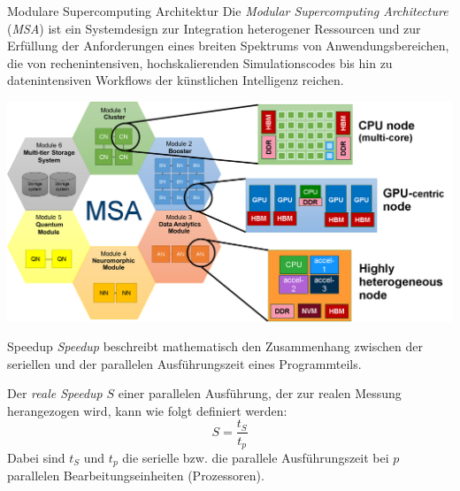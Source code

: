 \begin{jsc}{Modulare Supercomputing Architektur}
    Die \emph{Modular Supercomputing Architecture} (\emph{MSA}) ist ein Systemdesign zur Integration heterogener Ressourcen und zur Erfüllung der Anforderungen eines breiten Spektrums von Anwendungsbereichen, die von rechenintensiven, hochskalierenden Simulationscodes bis hin zu datenintensiven Workflows der künstlichen Intelligenz reichen.

    \vspace{1em}

    \centering
    \includegraphics[width=0.9\linewidth]{images/modular_supercomputing_architecture.png}
\end{jsc}

\begin{defi}{Speedup}
    \emph{Speedup} beschreibt mathematisch den Zusammenhang zwischen der seriellen und der parallelen Ausführungszeit eines Programmteils.

    Der \emph{reale Speedup} $S$ einer parallelen Ausführung, der zur realen Messung herangezogen wird, kann wie folgt definiert werden:
    \[
        S = \frac{t_S}{t_p}
    \]
    Dabei sind $t_S$ und $t_p$ die serielle bzw. die parallele Ausführungszeit bei $p$ parallelen Bearbeitungseinheiten (Prozessoren).
\end{defi}

